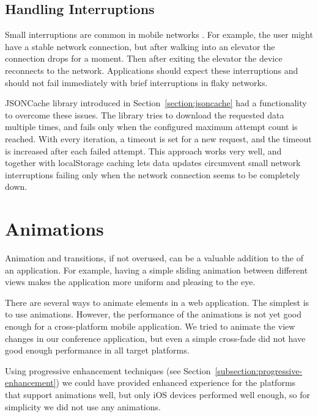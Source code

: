 
\subsection{Handling Interruptions}

Small interruptions are common in mobile networks \citationneeded. For
example, the user might have a stable network connection, but after
walking into an elevator the connection drops for a moment. Then after
exiting the elevator the device reconnects to the
network. Applications should expect these interruptions and should not
fail immediately with brief interruptions in flaky networks.

JSONCache library introduced in Section~\ref{section:jsoncache} had a
functionality to overcome these issues. The library tries to download
the requested data multiple times, and fails only when the configured
maximum attempt count is reached. With every iteration, a timeout is
set for a new request, and the timeout is increased after each failed
attempt. This approach works very well, and together with localStorage
caching lets data updates circumvent small network interruptions
failing only when the network connection seems to be completely down.

\section{Animations}
\label{section:animations}

Animation and transitions, if not overused, can be a valuable addition
to the  of an application. For example, having a simple
sliding animation between different views makes the application more
uniform and pleasing to the eye.

There are several ways to animate elements in a web application. The
simplest is to use  animations. However, the performance of
the animations is not yet good enough for a cross-platform mobile
application. We tried to animate the view changes in our conference
application, but even a simple cross-fade did not have good enough
performance in all target platforms.

Using progressive enhancement techniques (see
Section~\ref{subsection:progressive-enhancement}) we could have
provided enhanced experience for the platforms that support animations
well, but only iOS devices performed well enough, so for simplicity we
did not use any animations.

